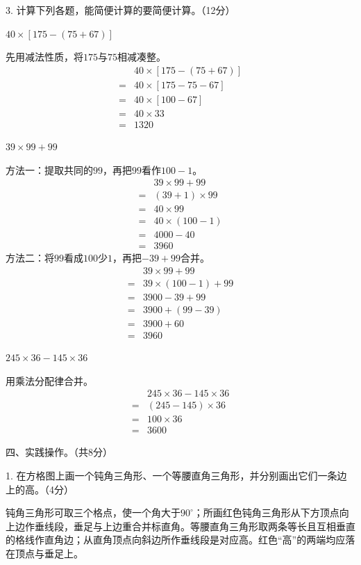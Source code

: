 3. 计算下列各题，能简便计算的要简便计算。（12分）\par \(40\times[175-(75+67)]\)\par
\begin{BookAnswer}
先用减法性质，将\(175\)与\(75\)相减凑整。\[\begin{aligned}&40\times[175-(75+67)]\\={}&40\times[175-75-67]\\={}&40\times[100-67]\\={}&40\times33\\={}&1320\end{aligned}\]
\end{BookAnswer}

\(39\times99+99\)\par
\begin{BookAnswer}
方法一：提取共同的\(99\)，再把\(99\)看作\(100-1\)。\[\begin{aligned}&39\times99+99\\={}&(39+1)\times99\\={}&40\times99\\={}&40\times(100-1)\\={}&4000-40\\={}&3960\end{aligned}\]方法二：将\(99\)看成\(100\)少\(1\)，再把\(-39+99\)合并。\[\begin{aligned}&39\times99+99\\={}&39\times(100-1)+99\\={}&3900-39+99\\={}&3900+(99-39)\\={}&3900+60\\={}&3960\end{aligned}\]
\end{BookAnswer}

\(245\times36-145\times36\)\par
\begin{BookAnswer}
用乘法分配律合并。\[\begin{aligned} &245\times36-145\times36\\ ={}&(245-145)\times36\\ ={}&100\times36\\ ={}&3600\end{aligned}\]
\end{BookAnswer}

四、实践操作。（共8分）\par 1. 在方格图上画一个钝角三角形、一个等腰直角三角形，并分别画出它们一条边上的高。（4分）\par
{}
\begin{BookAnswer}
钝角三角形可取三个格点，使一个角大于\(90^\circ\)；所画红色钝角三角形从下方顶点向上边作垂线段，垂足与上边重合并标直角。等腰直角三角形取两条等长且互相垂直的格线作直角边；从直角顶点向斜边所作垂线段是对应高。红色“高”的两端均应落在顶点与垂足上。
\end{BookAnswer}


